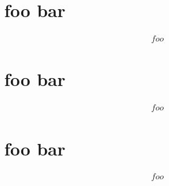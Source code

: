 \documentclass{scrbook}
\begin{document}
\chapter{foo bar}
\begin{align}
foo
\end{align}

\chapter{foo bar}
\begin{align}
foo
\end{align}

\chapter{foo bar}
\begin{align}
foo
\end{align}
\end{document}
